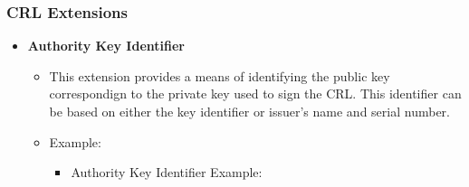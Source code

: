 \documentclass[12pt]{report}
\begin{document}
    \subsubsection{CRL Extensions}
        \begin{itemize}
            \item \textbf{Authority Key Identifier}
                \begin{itemize}
                    \item This extension provides a means of identifying the public key correspondign to the private key used to sign the CRL. This identifier can be based on either the key identifier or issuer's name and serial number. 
                    \item Example:
                        \begin{itemize}
                            \item Authority Key Identifier Example:


\end{itemize}
\end{itemize}
\end{itemize}
\end{document}
